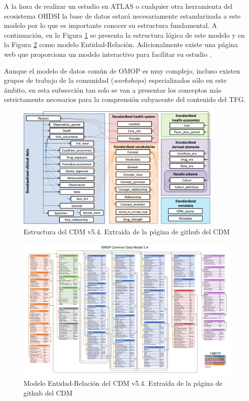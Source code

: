 A la hora de realizar un estudio en ATLAS o cualquier otra herramienta del ecosistema OHDSI la base de datos estará necesariamente estandarizada a este modelo por lo que es importante conocer su estructura fundamental. A continuación, en la Figura \ref{fig:cdm54} se presenta la estructura lógica de este modelo y en la Figura \ref{fig:cdm_ER} como modelo Entidad-Relación. Adicionalmente existe una página web que proporciona un modelo interactivo para facilitar su estudio \cite{CDMinteractive}.

Aunque el modelo de datos común de OMOP es muy complejo, incluso existen grupos de trabajo de la comunidad (\textit{workshops}) especializados sólo en este ámbito, en esta subsección tan solo se van a presentar los conceptos más estrictamente necesarios para la comprensión subyacente del contenido del TFG.

\begin{figure}[H]
    \centering
    \includegraphics[width=0.90\textwidth]{figures/cdm54.png}
     \caption{Estructura del CDM v5.4. Extraída de la página de github del CDM \cite{gitPagesCMD}}
    \label{fig:cdm54}
\end{figure}

\begin{figure}[H]
    \centering
    \includegraphics[width=1\textwidth]{figures/cdm_ER.jpg}
     \caption{Modelo Entidad-Relación del CDM v5.4. Extraída de la página de github del CDM \cite{gitPagesCMD}}
    \label{fig:cdm_ER}
\end{figure}

